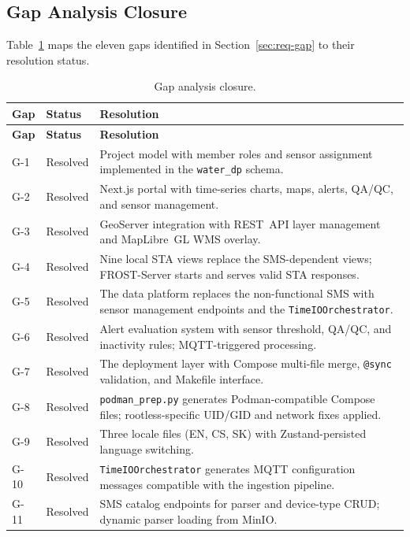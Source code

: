 \subsection{Gap Analysis Closure}
\label{sec:test-requirements-gaps}

Table~\ref{tab:gap-closure} maps the eleven gaps identified in
Section~\ref{sec:req-gap} to their resolution status.

\begin{longtable}{l l p{}}
  \caption{Gap analysis closure.}
  \label{tab:gap-closure} \\
  \textbf{Gap} & \textbf{Status} & \textbf{Resolution} \\
  \hline
  \endfirsthead
  \textbf{Gap} & \textbf{Status} & \textbf{Resolution} \\
  \hline
  \endhead
  G-1  & Resolved & Project model with member roles and sensor assignment
         implemented in the \texttt{water\_dp} schema. \\[3pt]
  G-2  & Resolved & Next.js portal with time-series charts, maps, alerts,
         QA/QC, and sensor management. \\[3pt]
  G-3  & Resolved & GeoServer integration with REST~API layer management and
         MapLibre~GL WMS overlay. \\[3pt]
  G-4  & Resolved & Nine local STA views replace the SMS-dependent views;
         FROST-Server starts and serves valid STA responses. \\[3pt]
  G-5  & Resolved & The data platform replaces the non-functional SMS with
         sensor management endpoints and the \texttt{TimeIOOrchestrator}. \\[3pt]
  G-6  & Resolved & Alert evaluation system with sensor threshold, QA/QC, and
         inactivity rules; MQTT-triggered processing. \\[3pt]
  G-7  & Resolved & The deployment layer with Compose multi-file merge,
         \texttt{@sync} validation, and Makefile interface. \\[3pt]
  G-8  & Resolved & \texttt{podman\_prep.py} generates Podman-compatible Compose
         files; rootless-specific UID/GID and network fixes applied. \\[3pt]
  G-9  & Resolved & Three locale files (EN, CS, SK) with Zustand-persisted
         language switching. \\[3pt]
  G-10 & Resolved & \texttt{TimeIOOrchestrator} generates MQTT configuration
         messages compatible with the ingestion pipeline. \\[3pt]
  G-11 & Resolved & SMS catalog endpoints for parser and device-type CRUD;
         dynamic parser loading from MinIO. \\
\end{longtable}

